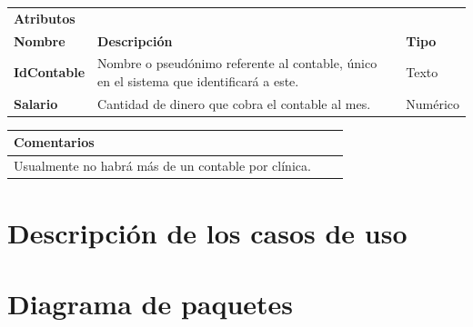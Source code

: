 \documentclass[11pt,a4paper]{article}
\begin{document}
\vspace{1cm}

\begin{table}[H]
	\label{my-label}
	\begin{tabularx}{\textwidth}{lXl}
		\textbf{Atributos}  &  & \\
		\textbf{Nombre}     & \textbf{Descripción} & \textbf{Tipo} \\ \hline
		\textbf{IdContable} & Nombre o pseudónimo referente al contable, único en el sistema que identificará a este. & Texto \\
		\textbf{Salario}    & Cantidad de dinero que cobra el contable al mes. & Numérico \\
	\end{tabularx}
\end{table}

\vspace{1cm}

\begin{table}[H]
	\begin{tabularx}{\textwidth}{lXX}
		\textbf{Comentarios} &  &  \\ \hline
		Usualmente no habrá más de un contable por clínica.
	\end{tabularx}
\end{table}



\section{Descripción de los casos de uso}


\section{Diagrama de paquetes}

	
\end{document}
